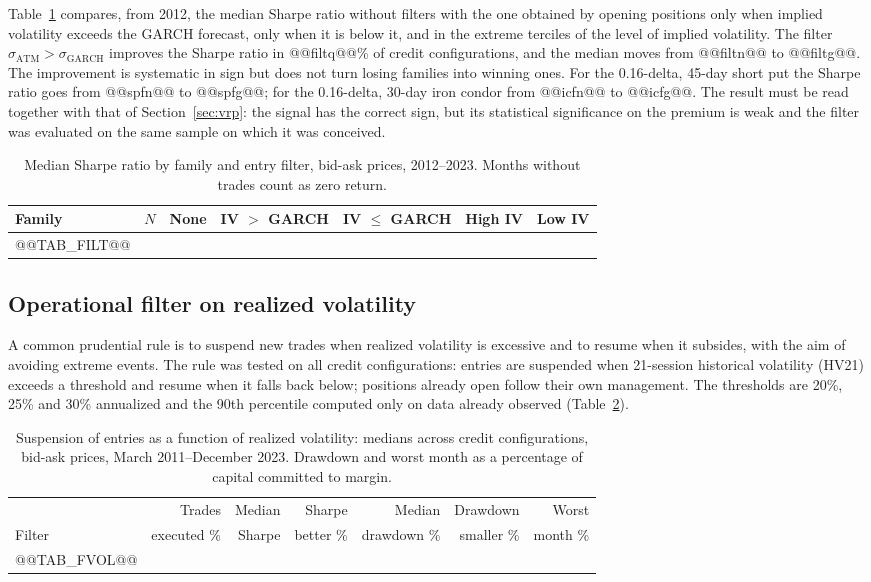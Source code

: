 \documentclass[11pt,a4paper]{article}
\begin{document}
Table~\ref{tab:filt} compares, from 2012, the median Sharpe ratio without filters with the one obtained by opening positions only when implied volatility exceeds the GARCH forecast, only when it is below it, and in the extreme terciles of the level of implied volatility. The filter $\sigma_{\mathrm{ATM}}>\sigma_{\mathrm{GARCH}}$ improves the Sharpe ratio in @@filtq@@\% of credit configurations, and the median moves from @@filtn@@ to @@filtg@@. The improvement is systematic in sign but does not turn losing families into winning ones. For the 0.16-delta, 45-day short put the Sharpe ratio goes from @@spfn@@ to @@spfg@@; for the 0.16-delta, 30-day iron condor from @@icfn@@ to @@icfg@@. The result must be read together with that of Section~\ref{sec:vrp}: the signal has the correct sign, but its statistical significance on the premium is weak and the filter was evaluated on the same sample on which it was conceived.

\begin{table}[ht]\centering\small
\caption{Median Sharpe ratio by family and entry filter, bid-ask prices, 2012--2023. Months without trades count as zero return.}\label{tab:filt}
\begin{tabular}{lrrrrrr}\toprule
Family & $N$ & None & IV $>$ GARCH & IV $\le$ GARCH & High IV & Low IV \\ \midrule
@@TAB_FILT@@
\bottomrule\end{tabular}\end{table}

\subsection{Operational filter on realized volatility}\label{sec:fvol}

A common prudential rule is to suspend new trades when realized volatility is excessive and to resume when it subsides, with the aim of avoiding extreme events. The rule was tested on all credit configurations: entries are suspended when 21-session historical volatility (HV21) exceeds a threshold and resume when it falls back below; positions already open follow their own management. The thresholds are 20\%, 25\% and 30\% annualized and the 90th percentile computed only on data already observed (Table~\ref{tab:fvol}).

\begin{table}[ht]\centering\small
\caption{Suspension of entries as a function of realized volatility: medians across credit configurations, bid-ask prices, March 2011--December 2023. Drawdown and worst month as a percentage of capital committed to margin.}\label{tab:fvol}
\begin{tabular}{lrrrrrr}\toprule
 & Trades & Median & Sharpe & Median & Drawdown & Worst \\
Filter & executed \% & Sharpe & better \% & drawdown \% & smaller \% & month \% \\ \midrule
@@TAB_FVOL@@
\bottomrule\end{tabular}\end{table}
\end{document}
